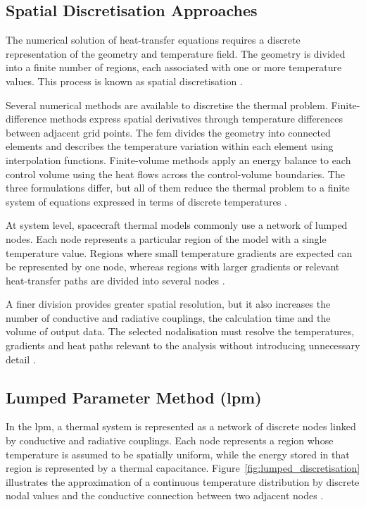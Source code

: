 \subsection{Spatial Discretisation Approaches}

The numerical solution of heat-transfer equations requires a discrete representation 
of the geometry and temperature field. The geometry is divided into a finite number 
of regions, each associated with one or more temperature values. This process is known 
as spatial discretisation \cite{spacethctrl,ecss_man}. 

\begin{sloppypar}
Several numerical methods are available to discretise the thermal problem. 
Finite-difference methods express spatial derivatives through temperature differences 
between adjacent grid points. The \acrfull{fem} divides the geometry into connected 
elements and describes the temperature variation within each element using interpolation 
functions. Finite-volume methods apply an energy balance to each control volume using 
the heat flows across the control-volume boundaries. The three formulations differ, but all of them 
reduce the thermal problem to a finite system of equations expressed in terms of 
discrete temperatures \cite{th_handbook,ecss_man}.
\end{sloppypar}

At system level, spacecraft thermal models commonly use a network of lumped nodes. 
Each node represents a particular region of the model with a single temperature value. 
Regions where small temperature gradients are expected can be represented by one node, 
whereas regions with larger gradients or relevant heat-transfer paths are divided into 
several nodes \cite{spacethctrl,ecss_man}. 

A finer division provides greater spatial resolution, but it also increases the number 
of conductive and radiative couplings, the calculation time and the volume of output 
data. The selected nodalisation must resolve the temperatures, gradients and heat paths 
relevant to the analysis without introducing unnecessary detail 
\cite{th_handbook,ecss_man}.

\subsection{
    \texorpdfstring
    {Lumped Parameter Method (\acrshort{lpm})}
    {Lumped Parameter Method (LPM)}
}

In the \acrshort{lpm}, a thermal system is represented as a network of discrete nodes 
linked by conductive and radiative couplings. 
Each node represents a region whose temperature is assumed to be spatially uniform, 
while the energy stored in that region is represented by a thermal capacitance. Figure~\ref{fig:lumped_discretisation} 
illustrates the approximation of a continuous temperature distribution by discrete nodal values and the conductive 
connection between two adjacent nodes \cite{th_handbook,thermal_eng_man}.

